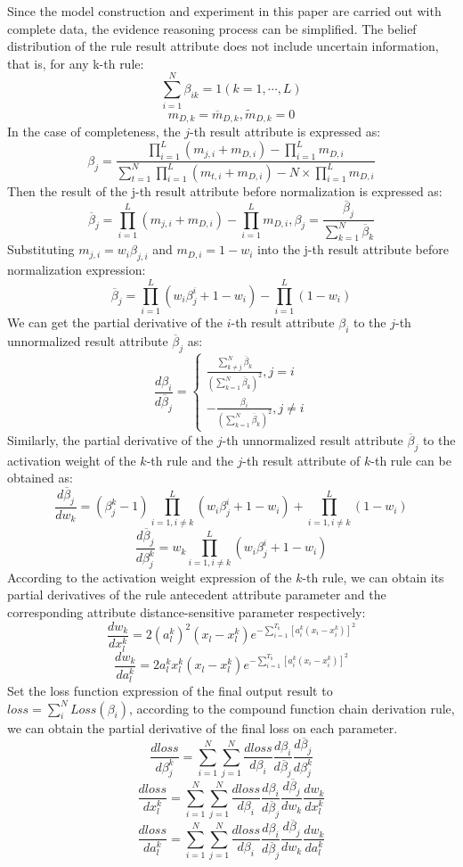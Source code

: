 \documentclass{ieeeaccess}
\begin{document}
Since the model construction and experiment in this paper are carried out with complete data, the evidence reasoning process can be simplified.
The belief distribution of the rule result attribute does not include uncertain information, that is, for any k-th rule:
$$\sum_{i=1}^N\beta_{ik}=1(k=1,\cdots,L)$$
$$m_{D,k}=\overline{m}_{D,k},\widetilde{m}_{D,k}=0$$
In the case of completeness, the $j$-th result attribute is expressed as:
$$\beta_j=\frac{\prod_{i=1}^L(m_{j,i}+m_{D,i})-\prod_{i=1}^Lm_{D,i}}{\sum_{t=1}^N\prod_{i=1}^L(m_{t,i}+m_{D,i})-N\times\prod_{i=1}^Lm_{D,i}}$$
Then the result of the j-th result attribute before normalization is expressed as:
$$\overline{\beta}_j = \prod_{i=1}^L(m_{j,i}+m_{D,i})-\prod_{i=1}^Lm_{D,i},\beta_j=\frac{\overline{\beta}_j}{\sum_{k=1}^N\overline{\beta}_k}$$
Substituting $m_{j,i}=w_i\beta_{j,i}$ and $m_{D,i}=1-w_i$ into the j-th result attribute before normalization expression:
$$\overline{\beta}_j = \prod_{i=1}^L(w_i\beta_j^i+1-w_i)-\prod_{i=1}^L{(1-w_i)}$$
We can get the partial derivative of the $i$-th result attribute $\beta_i$ to the $j$-th unnormalized result attribute $\overline{\beta}_j$ as:
$$\frac{d\beta_i}{d\overline{\beta}_j}=
    \left\{
    \begin{aligned}
        \frac{\sum_{k\neq j}^N\overline{\beta}_k}{(\sum_{k=1}^N\overline{\beta}_k)^2},j=i \\
        -\frac{\beta_i}{(\sum_{k=1}^N\overline{\beta}_k)^2},j\neq i
    \end{aligned}
    \right.$$
Similarly, the partial derivative of the $j$-th unnormalized result attribute $\overline{\beta}_j$ to the activation weight of the $k$-th rule and the $j$-th result attribute of $k$-th rule can be obtained as:
$$\frac{d\overline{\beta}_j}{dw_k}=(\beta_j^k-1)\prod_{i=1,i\neq k}^L(w_i\beta_j^i+1-w_i)+\prod_{i=1,i\neq k}^L(1-w_i)$$
$$\frac{d\overline{\beta}_j}{d\beta_j^k}=w_k\prod_{i=1,i\neq k}^L(w_i\beta_j^i+1-w_i)$$
According to the activation weight expression of the $k$-th rule, we can obtain its partial derivatives of the rule antecedent attribute parameter and the corresponding attribute distance-sensitive parameter respectively:
$$\frac{dw_k}{dx_l^k}=2(a_l^k)^2(x_l-x_l^k)e^{-\sum_{i=1}^{T_k}[a_i^k(x_i-x_i^k)]^2}$$
$$\frac{dw_k}{da_l^k}=2a_l^kx_l^k(x_l-x_l^k)e^{-\sum_{i=1}^{T_k}[a_i^k(x_i-x_i^k)]^2}$$
Set the loss function expression of the final output result to $loss=\sum_i^NLoss(\beta_i)$, according to the compound function chain derivation rule, we can obtain the partial derivative of the final loss on each parameter.
$$\frac{dloss}{d\beta_j^k}=\sum_{i=1}^N\sum_{j=1}^N\frac{dloss}{d\beta_i}\frac{d\beta_i}{d\overline{\beta}_j}\frac{d\overline{\beta}_j}{d\beta_j^k}$$
$$\frac{dloss}{dx_l^k}=\sum_{i=1}^N\sum_{j=1}^N\frac{dloss}{d\beta_i}\frac{d\beta_i}{d\overline{\beta}_j}\frac{d\overline{\beta}_j}{dw_k}\frac{dw_k}{dx_l^k}$$
$$\frac{dloss}{da_l^k}=\sum_{i=1}^N\sum_{j=1}^N\frac{dloss}{d\beta_i}\frac{d\beta_i}{d\overline{\beta}_j}\frac{d\overline{\beta}_j}{dw_k}\frac{dw_k}{da_l^k}$$
\end{document}
